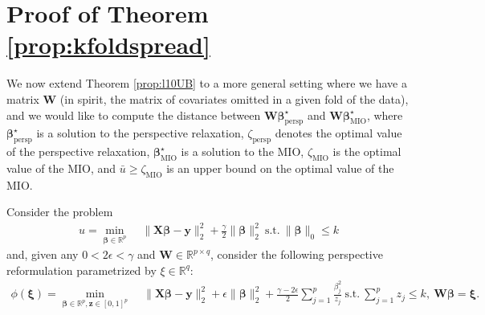 \documentclass[opre,nonblindrev]{informs3} %
\begin{document}
{
\section{Proof of Theorem \ref{prop:kfoldspread}}\label{ssec:kfoldspreadappend}


We now extend Theorem \ref{prop:l10UB} to a more general setting where we have a matrix $\bm{W}$ (in spirit, the matrix of covariates omitted in a given fold of the data), and we would like to compute the distance between $\bm{W}\bm{\beta}^\star_{\text{persp}}$ and $\bm{W}\bm{\beta}^\star_{\text{MIO}}$, where $\bm{\beta}^\star_{\text{persp}}$ is a solution to the perspective relaxation, $\zeta_{\text{persp}}$ denotes the optimal value of the perspective relaxation, $\bm{\beta}^\star_{\text{MIO}}$ is a solution to the MIO, $\zeta_{\text{MIO}}$ is the optimal value of the MIO, and $\bar{u} \geq \zeta_{\text{MIO}}$ is an upper bound on the optimal value of the MIO. 

Consider the problem 
\begin{equation}\label{eq:MIPOut2}
	\begin{aligned}
		u=\min_{\bm{\beta}\in \mathbb{R}^p}\;& \|\bm{X}\bm{\beta}-\bm{y}\|_2^2+\frac{\gamma}{2}\|\bm{\beta}\|_2^2\ \text{s.t.}\ \|\bm{\beta}\|_0\leq k
	\end{aligned}
\end{equation}
and, given any $0<2 \epsilon<\gamma$ and $\bm{W}\in \mathbb{R}^{p \times q}$, consider the following perspective reformulation parametrized by $\xi\in \mathbb{R}^q$:
\begin{align*}
	\phi(\bm{\xi})=\min_{\bm{\beta}\in \mathbb{R}^p,\bm{z}\in [0,1]^p}\;& \|\bm{X}\bm{\beta}-\bm{y}\|_2^2+\epsilon\|\bm{\beta}\|_2^2+\frac{\gamma-2\epsilon}{2}\sum_{j=1}^p \frac{\beta_j^2}{z_j}\ \text{s.t.}\ \sum_{j=1}^p z_j\leq k,\ \bm{W\beta}=\bm{\xi}.
\end{align*}

}
\end{document}
